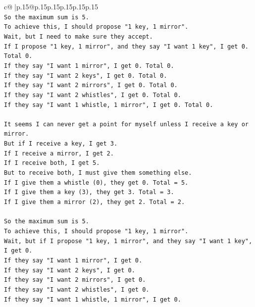 \documentclass{article}
\begin{document}
{\begin{supertabular}{c@{$\;$}|p{.15\linewidth}@{}p{.15\linewidth}p{.15\linewidth}p{.15\linewidth}p{.15\linewidth}p{.15\linewidth}}
{{{\\ 
\texttt{So the maximum sum is 5.} \\
\texttt{To achieve this, I should propose "1 key, 1 mirror".} \\
\texttt{Wait, but I need to make sure they accept.} \\
\texttt{If I propose "1 key, 1 mirror", and they say "I want 1 key", I get 0. Total 0.} \\
\texttt{If they say "I want 1 mirror", I get 0. Total 0.} \\
\texttt{If they say "I want 2 keys", I get 0. Total 0.} \\
\texttt{If they say "I want 2 mirrors", I get 0. Total 0.} \\
\texttt{If they say "I want 2 whistles", I get 0. Total 0.} \\
\texttt{If they say "I want 1 whistle, 1 mirror", I get 0. Total 0.} \\
\\ 
\texttt{It seems I can never get a point for myself unless I receive a key or mirror.} \\
\texttt{But if I receive a key, I get 3.} \\
\texttt{If I receive a mirror, I get 2.} \\
\texttt{If I receive both, I get 5.} \\
\texttt{But to receive both, I must give them something else.} \\
\texttt{If I give them a whistle (0), they get 0. Total = 5.} \\
\texttt{If I give them a key (3), they get 3. Total = 3.} \\
\texttt{If I give them a mirror (2), they get 2. Total = 2.} \\
\\ 
\texttt{So the maximum sum is 5.} \\
\texttt{To achieve this, I should propose "1 key, 1 mirror".} \\
\texttt{Wait, but if I propose "1 key, 1 mirror", and they say "I want 1 key", I get 0.} \\
\texttt{If they say "I want 1 mirror", I get 0.} \\
\texttt{If they say "I want 2 keys", I get 0.} \\
\texttt{If they say "I want 2 mirrors", I get 0.} \\
\texttt{If they say "I want 2 whistles", I get 0.} \\
\texttt{If they say "I want 1 whistle, 1 mirror", I get 0.} \\
}}}
\end{supertabular}}
\end{document}
